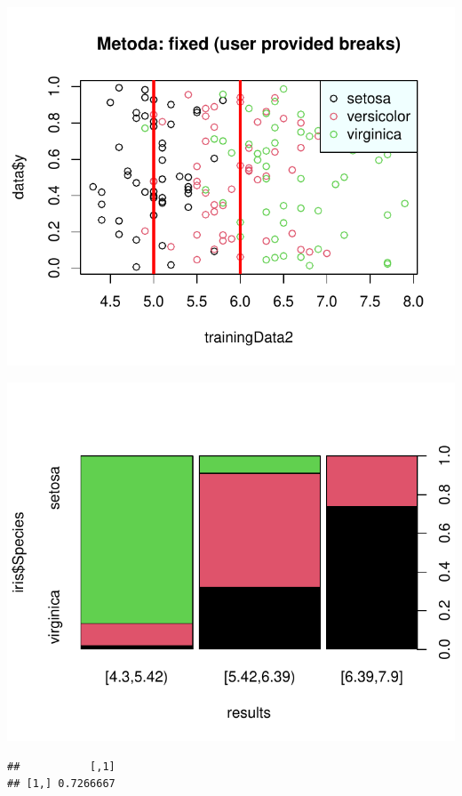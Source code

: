 \documentclass[
  12pt,
]{article}
\begin{document}
\begin{center}\includegraphics{Sprawozdanie2_files/figure-latex/givenRanges_najg-2} \end{center}

\begin{center}\includegraphics{Sprawozdanie2_files/figure-latex/tabela_kondygnacji_4_najg-1} \end{center}

\begin{verbatim}
##           [,1]
## [1,] 0.7266667
\end{verbatim}
\end{document}
